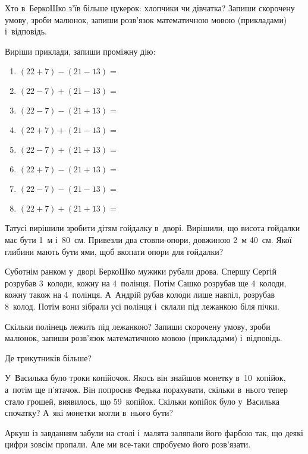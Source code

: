Хто в~БеркоШко з’їв більше цукерок: хлопчики чи дівчатка?
Запиши скорочену умову, зроби малюнок, запиши розв’язок
математичною мовою (прикладами) і~відповідь.


\problem
Виріши приклади, запиши проміжну дію:
\begin{multicols}{2}
    \begin{enumerate}
        \item $(22 + 7) - (21 - 13) =$
        \item $(22 - 7) + (21 - 13) =$
        \item $(22 - 7) - (21 + 13) =$
        \item $(22 + 7) + (21 - 13) =$
        \item $(22 - 7) + (21 + 13) =$
        \item $(22 + 7) - (21 + 13) =$
        \item $(22 - 7) - (21 - 13) =$
        \item $(22 + 7) + (21 + 13) =$
    \end{enumerate}
\end{multicols}


\problem
Татусі вирішили зробити дітям гойдалку в~дворі.
Вирішили, що висота гойдалки має бути 1~м і~80~см.
Привезли два стовпи-опори, довжиною 2~м 40~см.
Якої глибини мають бути ями, щоб вкопати опори для гойдалки?


\problem
Суботнім ранком у~дворі БеркоШко мужики рубали дрова.
Спершу Сергій розрубав 3~колоди, кожну на 4~полінця.
Потім Сашко розрубав ще 4~колоди, кожну також на 4~полінця.
А~Андрій рубав колоди лише навпіл, розрубав 8~колод.
Потім вони зібрали усі полінця і~склали під лежанкою біля пічки.

Скільки полінець лежить під лежанкою?
Запиши скорочену умову, зроби малюнок,
запиши розв’язок математичною мовою (прикладами) і~відповідь.


\problem
Де трикутників більше?


\problem
У~Василька було троки копійочок.
Якось він знайшов монетку в~10~копійок, а~потім ще п’ятачок.
Він попросив Федька порахувати, скільки в~нього тепер стало грошей,
виявилось, що 59~копійок.
Скільки копійок було у~Василька спочатку?
А~які монетки могли в~нього бути? 


\problem
Аркуш із завданням забули на столі і~малята заляпали його фарбою так,
що деякі цифри зовсім пропали.
Але ми все-таки спробуємо його розв’язати.

